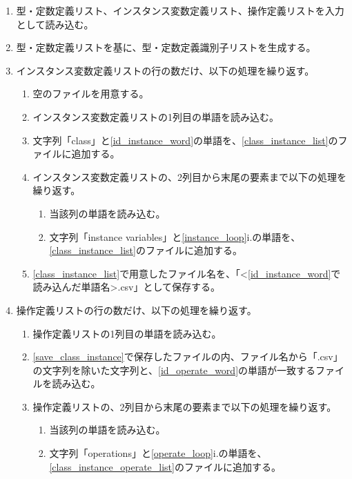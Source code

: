 \begin{enumerate}
    \item 型・定数定義リスト、インスタンス変数定義リスト、操作定義リストを入力として読み込む。
    \item 型・定数定義リストを基に、型・定数定義識別子リストを生成する。
    \item インスタンス変数定義リストの行の数だけ、以下の処理を繰り返す。
        \begin{enumerate}
            \item 空のファイルを用意する。
            \label{class_instance_list}
            \item インスタンス変数定義リストの1列目の単語を読み込む。
            \label{id_instance_word}
            \item 文字列「class」と\ref{id_instance_word}の単語を、\ref{class_instance_list}のファイルに追加する。
            \item インスタンス変数定義リストの、2列目から末尾の要素まで以下の処理を繰り返す。
            \label{instance_loop}
                \begin{enumerate}
                    \item 当該列の単語を読み込む。
                    \label{instance_word}
                    \item 文字列「instance variables」と\ref{instance_loop}i.の単語を、\ref{class_instance_list}のファイルに追加する。
                \end{enumerate}
            \item \ref{class_instance_list}で用意したファイル名を、「\textless \ref{id_instance_word}で読み込んだ単語名\textgreater.csv」として保存する。
            \label{save_class_instance}
        \end{enumerate}
    \item 操作定義リストの行の数だけ、以下の処理を繰り返す。
        \begin{enumerate}
            \item 操作定義リストの1列目の単語を読み込む。
            \label{id_operate_word}
            \item \ref{save_class_instance}で保存したファイルの内、ファイル名から「.csv」の文字列を除いた文字列と、\ref{id_operate_word}の単語が一致するファイルを読み込む。
            \label{class_instance_operate_list}
            \item 操作定義リストの、2列目から末尾の要素まで以下の処理を繰り返す。
            \label{operate_loop}
                \begin{enumerate}
                    \item 当該列の単語を読み込む。
                    \label{operate_word}
                    \item 文字列「operations」と\ref{operate_loop}i.の単語を、\ref{class_instance_operate_list}のファイルに追加する。
                \end{enumerate}
        \end{enumerate}
\end{enumerate}

